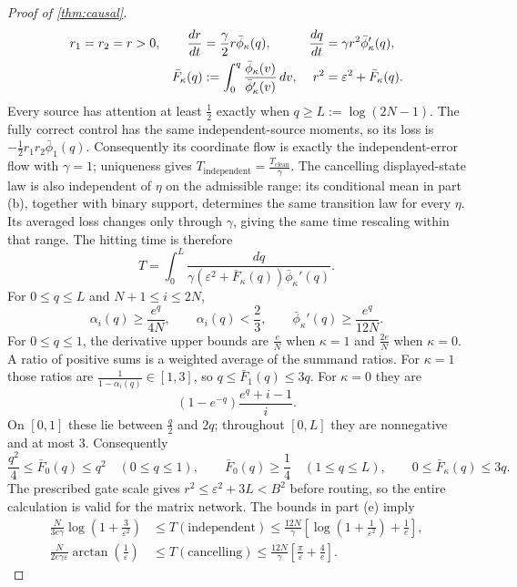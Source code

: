 \begin{proof}[Proof of \cref{thm:causal}]
\begin{align*}
 r_1=r_2=r>0,\qquad
 \frac{d r}{d t}&=\frac{\gamma}{2}r\bar \phi_\kappa(q),&
 \frac{d q}{d t}&=\gamma r^2\bar \phi_\kappa'(q),\\
 \bar F_\kappa(q)&:=\int_0^q\frac{\bar \phi_\kappa(v)}{\bar \phi_\kappa'(v)}\,dv,&
 r^2&=\varepsilon^2+\bar F_\kappa(q).
\end{align*}
Every source has attention at least $\tfrac{1}{2}$ exactly when $q\ge L:=\log(2N-1)$.
The fully correct control has the same independent-source moments, so its loss is $-\tfrac12r_1r_2\bar\phi_1(q)$.
Consequently its coordinate flow is exactly the independent-error flow with $\gamma=1$;
uniqueness gives $T_{\mathrm{independent}}=\tfrac{T_{\mathrm{clean}}}{\gamma}$.
The cancelling displayed-state law is also independent of $\eta$ on the admissible range:
its conditional mean in part (b), together with binary support, determines the same transition law for every $\eta$.
Its averaged loss changes only through $\gamma$, giving the same time rescaling within that range.
The hitting time is therefore
\[
 T=\int_0^L\frac{dq}{\gamma(\varepsilon^2+\bar F_\kappa(q))\bar \phi_\kappa'(q)}.
\]
For $0\le q\le L$ and $N+1\le i\le2N$,
\[
 \alpha_i(q)\ge\frac{e^q}{4N},\qquad \alpha_i(q)<\frac{2}{3},\qquad
 \bar \phi_\kappa'(q)\ge\frac{e^q}{12N}.
\]
For $0\le q\le1$, the derivative upper bounds are $\tfrac{e}{N}$ when $\kappa=1$ and $\tfrac{2e}{N}$ when $\kappa=0$.
A ratio of positive sums is a weighted average of the summand ratios. For $\kappa=1$ those ratios are
$\tfrac{1}{1-\alpha_i(q)}\in[1,3]$, so $q\le\bar F_1(q)\le3q$.
For $\kappa=0$ they are
\[
 (1-e^{-q})\frac{e^q+i-1}{i}.
\]
On $[0,1]$ these lie between $\tfrac{q}{2}$ and $2q$; throughout $[0,L]$ they are nonnegative and at most $3$.
Consequently
\[
 \frac{q^2}{4}\le\bar F_0(q)\le q^2\quad(0\le q\le1),\qquad
 \bar F_0(q)\ge\frac{1}{4}\quad(1\le q\le L),\qquad
 0\le\bar F_\kappa(q)\le3q.
\]
The prescribed gate scale gives $r^2\le \varepsilon^2+3L<B^2$ before routing, so the entire calculation is valid for the matrix network.
The bounds in part (e) imply
\begin{align*}
 \frac{N}{3e\gamma}\log\!\left(1+\frac{3}{\varepsilon^2}\right)
 &\le T(\mathrm{independent})
 \le\frac{12N}{\gamma}\left[\log\!\left(1+\frac{1}{\varepsilon^2}\right)+\frac{1}{e}\right],\\
 \frac{N}{2e \gamma \varepsilon}\arctan\!\left(\frac{1}{\varepsilon}\right)
 &\le T(\mathrm{cancelling})
 \le\frac{12N}{\gamma}\left[\frac{\pi}{\varepsilon}+\frac{4}{e}\right].

\end{align*}
\end{proof}
